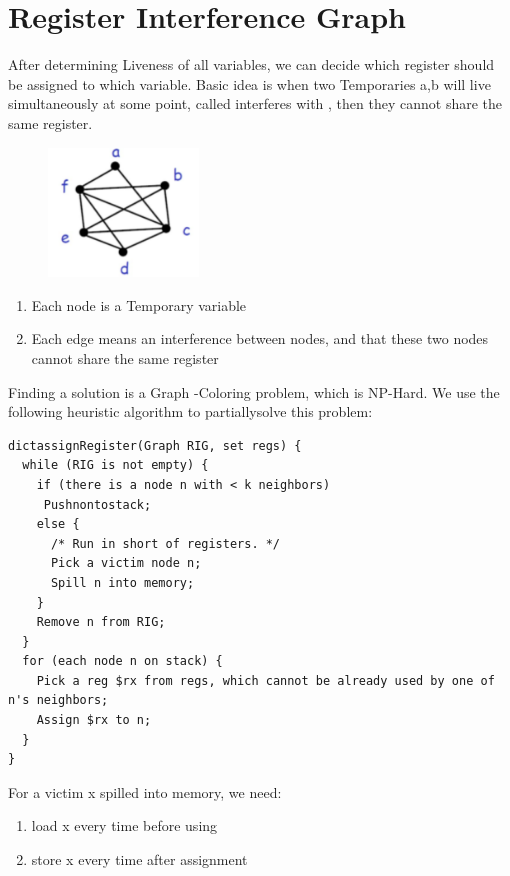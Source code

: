 \documentclass[a4paper]{exam}
\theoremstyle{definition}
\begin{document}
\section{Register Interference Graph}
After determining Liveness of all variables, we can decide which register should be assigned to which variable. Basic idea is when two Temporaries a,b will live simultaneously at some point, called  interferes with , then they cannot share the same register.
\begin{figure}[htbp]
  \centering
  \includegraphics[width=4cm]{./img/reg.png}
\end{figure}
\begin{enumerate}
    \item Each node is a Temporary variable
\item Each edge means an interference between nodes, and that these two nodes cannot share the same register
\end{enumerate}

Finding a solution is a Graph -Coloring problem, which is NP-Hard. We use the following heuristic algorithm to partiallysolve this problem:
\begin{verbatim}
dictassignRegister(Graph RIG, set regs) {
  while (RIG is not empty) {
    if (there is a node n with < k neighbors)
     Pushnontostack;
    else {  
      /* Run in short of registers. */
      Pick a victim node n;
      Spill n into memory; 
    }
    Remove n from RIG;  
  }
  for (each node n on stack) {
    Pick a reg $rx from regs, which cannot be already used by one of n's neighbors;
    Assign $rx to n;   
  }
}
\end{verbatim}
For a victim x spilled into memory, we need:
\begin{enumerate}
    \item load  x every time before using
    \item store x every time after assignment
\end{enumerate}
\end{document}
